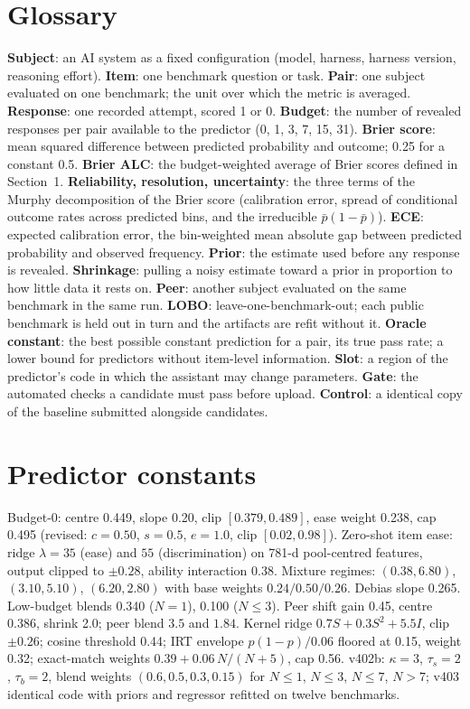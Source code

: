 \documentclass{article}
\begin{document}
\section{Glossary}
\label{app:glossary}
\textbf{Subject}: an AI system as a fixed configuration (model, harness, harness version, reasoning effort). \textbf{Item}: one benchmark question or task. \textbf{Pair}: one subject evaluated on one benchmark; the unit over which the metric is averaged. \textbf{Response}: one recorded attempt, scored 1 or 0. \textbf{Budget}: the number of revealed responses per pair available to the predictor (0, 1, 3, 7, 15, 31). \textbf{Brier score}: mean squared difference between predicted probability and outcome; 0.25 for a constant 0.5. \textbf{Brier ALC}: the budget-weighted average of Brier scores defined in Section~1. \textbf{Reliability, resolution, uncertainty}: the three terms of the Murphy decomposition of the Brier score (calibration error, spread of conditional outcome rates across predicted bins, and the irreducible $\bar p(1-\bar p)$). \textbf{ECE}: expected calibration error, the bin-weighted mean absolute gap between predicted probability and observed frequency. \textbf{Prior}: the estimate used before any response is revealed. \textbf{Shrinkage}: pulling a noisy estimate toward a prior in proportion to how little data it rests on. \textbf{Peer}: another subject evaluated on the same benchmark in the same run. \textbf{LOBO}: leave-one-benchmark-out; each public benchmark is held out in turn and the artifacts are refit without it. \textbf{Oracle constant}: the best possible constant prediction for a pair, its true pass rate; a lower bound for predictors without item-level information. \textbf{Slot}: a region of the predictor's code in which the assistant may change parameters. \textbf{Gate}: the automated checks a candidate must pass before upload. \textbf{Control}: a identical copy of the baseline submitted alongside candidates.

\section{Predictor constants}
\label{app:constants}
Budget-0: centre 0.449, slope 0.20, clip $[0.379,0.489]$, ease weight 0.238, cap 0.495 (revised: $c=0.50$, $s=0.5$, $e=1.0$, clip $[0.02,0.98]$). Zero-shot item ease: ridge $\lambda=35$ (ease) and $55$ (discrimination) on 781-d pool-centred features, output clipped to $\pm0.28$, ability interaction 0.38. Mixture regimes: $(0.38,6.80)$, $(3.10,5.10)$, $(6.20,2.80)$ with base weights $0.24/0.50/0.26$. Debias slope 0.265. Low-budget blends 0.340 ($N{=}1$), 0.100 ($N\le3$). Peer shift gain 0.45, centre 0.386, shrink 2.0; peer blend $3.5$ and $1.84$. Kernel ridge $0.7S+0.3S^2+5.5I$, clip $\pm0.26$; cosine threshold 0.44; IRT envelope $p(1-p)/0.06$ floored at 0.15, weight 0.32; exact-match weights $0.39+0.06\,N/(N+5)$, cap 0.56. v402b: $\kappa=3$, $\tau_s=2$, $\tau_b=2$, blend weights $(0.6,0.5,0.3,0.15)$ for $N\le1$, $N\le3$, $N\le7$, $N>7$; v403 identical code with priors and regressor refitted on twelve benchmarks.
\end{document}
